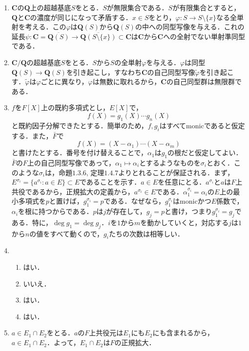 \documentclass[a4paper,10pt]{ltjsarticle}
\begin{document}
\begin{enumerate}[]
  \item \label{enshu:1.36} $\mathbf{C}$の$\mathbf{Q}$上の超越基底$S$をとる．$S$が無限集合である．$S$が有限集合とすると，$\mathbf{Q}$と$\mathbf{C}$の濃度が同じになって矛盾する．$x \in S$をとり，$\varphi : S \to S \setminus \{x\}$なる全単射を考える．この$\varphi$は$\mathbf{Q}(S)$から$\mathbf{Q}(S)$の中への同型写像を与える．これの延長$\psi : \mathbf{C} = \overline{\mathbf{Q}(S)} \to \overline{\mathbf{Q}(S\setminus \{x\})} \subset \mathbf{C}$は$\mathbf{C}$から$\mathbf{C}$への全射でない単射準同型である．
  \item \label{enshu:1.37} $\mathbf{C} / \mathbf{Q}$の超越基底$S$をとる．$S$から$S$の全単射$\varphi$を与える．$\varphi$は同型$\mathbf{Q}(S) \to \mathbf{Q}(S)$を引き起こし，すなわち$\mathbf{C}$の自己同型写像$\tilde{\varphi}$を引き起こす．$\tilde{\varphi}$は$\varphi$ごとに異なり，$\varphi$は無数に取れるから，$\mathbf{C}$の自己同型群は無限群である．
  \item \label{enshu:1.38} $f$を$F[X]$上の既約多項式とし，$E[X]$で，
  \[ f(X) = g_1(X) \cdots g_n(X) \]
  と既約因子分解できたとする．簡単のため，$f, g_i$はすべてmonicであると仮定する．また，$\bar{F}$で
  \[ f(X) = (X - \alpha_1) \cdots (X - \alpha_m) \]
  と書けたとする．番号を付け替えることで，$\alpha_1$は$g_1$の根だと仮定してよい．$\bar{F}$の$F$上の自己同型写像であって，$\alpha_1 \mapsto \alpha_i$とするようなものを$\sigma_i$とおく．このような$\sigma_i$は，命題$1.3.6$, 定理$1.4.7$よりとれることが保証される．まず，$E ^ {\sigma_i} = \{a ^ {\sigma_i} : a \in E\} \subset E$であることを示す．$a \in E$を任意にとる．$a ^ {\sigma_i}$と$a$は$F$上共役であるから，正規拡大の定義から，$a ^ {\sigma_i} \in E$である．$\alpha_1 ^ {\sigma_i} = \alpha_i$の$E$上の最小多項式を$p$と置けば，$g_1 ^ {\sigma_i} = p$である．なぜなら，$g_1 ^ {\sigma_i}$はmonicかつ$E$係数で，$\alpha_i$を根に持つからである．$p$は$j$が存在して，$g_j = p$と書け，つまり$g_1 ^ {\sigma_i} = g_j$である．特に，$\deg g_1 = \deg g_j$．$i$を$1$から$m$を動かしていくと，対応する$j$は$1$から$n$の値をすべて動くので，$g_i$たちの次数は相等しい．
  \item \label{enshu:1.39} \ 
  \begin{enumerate}
    \item \label{enshu:1.39.1} はい．
    \item \label{enshu:1.39.2} いいえ．
    \item \label{enshu:1.39.3} はい．
    \item \label{enshu:1.39.4} はい．
  \end{enumerate}
  \item \label{enshu:1.40} $a \in E_1 \cap E_2$をとる．$a$の$F$上共役元は$E_1$にも$E_2$にも含まれるから，$a \in E_1 \cap E_2$．よって，$E_1 \cap E_2$は$F$の正規拡大．

\end{enumerate}
\end{document}
